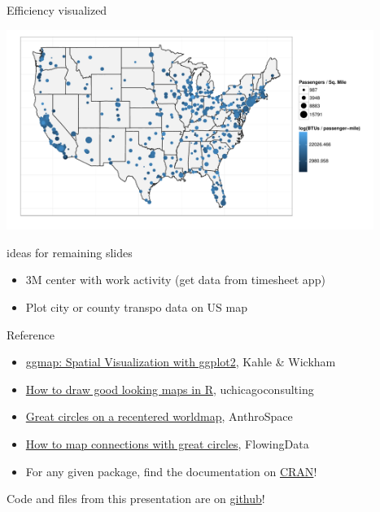 \documentclass[sans,aspectratio=169,presentation,bigger,fleqn]{beamer}
\begin{document}
\begin{frame}[label=sec-30]{Efficiency visualized}
\begin{center}
\includegraphics[height=6.5cm]{./img/transpo-plot.pdf}
\end{center}

\normalsize
\end{frame}


\begin{frame}[label=sec-31]{ideas for remaining slides}
\begin{itemize}
\item 3M center with work activity (get data from timesheet app)
\item Plot city or county transpo data on US map
\end{itemize}
\end{frame}
\begin{frame}[label=sec-32]{Reference}
\begin{itemize}
\item \href{http://stat405.had.co.nz/ggmap.pdf}{ggmap: Spatial Visualization with ggplot2}, Kahle \& Wickham
\item \href{http://uchicagoconsulting.wordpress.com/2011/04/18/how-to-draw-good-looking-maps-in-r/}{How to draw good looking maps in R}, uchicagoconsulting
\item \href{http://www.stanford.edu/~cengel/cgi-bin/anthrospace/great-circles-on-a-recentered-worldmap-in-ggplot}{Great circles on a recentered worldmap}, AnthroSpace
\item \href{http://flowingdata.com/2011/05/11/how-to-map-connections-with-great-circles/}{How to map connections with great circles}, FlowingData
\item For any given package, find the documentation on \href{http://cran.r-project.org/}{CRAN}!
\end{itemize}

\vspace{0.5cm}

Code and files from this presentation are on \href{https://github.com/jwhendy/devFest-geo}{github}!
\end{frame}
\end{document}
